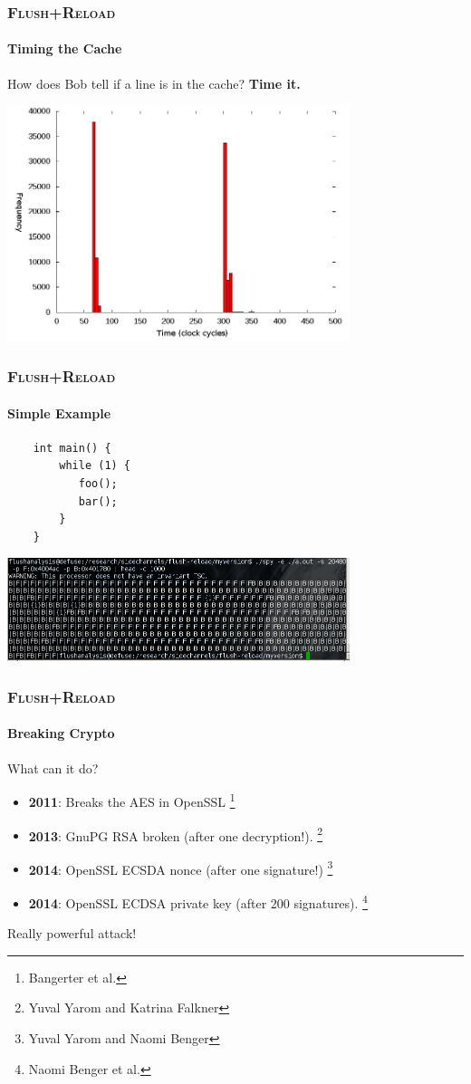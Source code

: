 \documentclass{beamer}
\begin{document}
\begin{frame}
    \frametitle{\textsc{Flush+Reload}}
    \framesubtitle{Timing the Cache}

    How does Bob tell if a line is in the cache? \textbf{Time it.}

    \includegraphics[width=10cm,keepaspectratio]{benchmark.png}
\end{frame}

\begin{frame}[fragile]
    \frametitle{\textsc{Flush+Reload}}
    \framesubtitle{Simple Example}

    \begin{verbatim}
    int main() {
        while (1) {
           foo();
           bar();
        }
    }
    \end{verbatim}

    \includegraphics[width=10cm,keepaspectratio]{simpledemo.png}
\end{frame}

\begin{frame}
    \frametitle{\textsc{Flush+Reload}}
    \framesubtitle{Breaking Crypto}

    What can it do?

    \begin{itemize}
        \item \textbf{2011}: Breaks the AES in OpenSSL \footnote{Bangerter et al.}
        \item \textbf{2013}: GnuPG RSA broken (after one decryption!). \footnote{Yuval Yarom and Katrina Falkner}
        \item \textbf{2014}: OpenSSL ECSDA nonce (after one signature!) \footnote{Yuval Yarom and Naomi Benger}
        \item \textbf{2014}: OpenSSL ECDSA private key (after 200 signatures). \footnote{Naomi Benger et al.}
    \end{itemize}

    Really powerful attack!
\end{frame}
\end{document}

